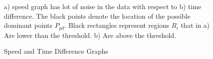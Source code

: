 \documentclass[preprint,10pt,5p,twocolumn]{elsarticle}
\begin{document}
 \begin{figure}
	\centering
			\hfill
	\caption{Speed and Time Difference Graphs}  a) speed graph has lot of noise in the data with respect to b) time difference.   The black points denote the location of the possible dominant points $P_{pd}$. Black rectangles represent regions $R_i$ that in a) Are lower than the threshold. b) Are above the threshold. 
	\label{fig:speed2Distance}
\end{figure}
\end{document}
